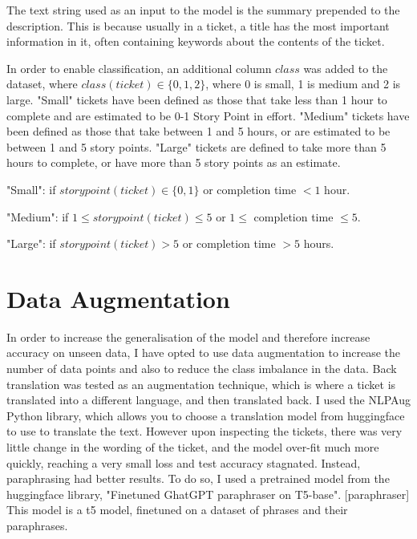 \documentclass{UoYCSproject}
\begin{document}
The text string used as an input to the model is the summary prepended to the description.
This is because usually in a ticket, a title has the most important information in it, often containing keywords about the contents of the ticket. \par

In order to enable classification, an additional column $class$ was added to the dataset, where $class(ticket) \in \{0,1,2\}$, where 0 is small, 1 is medium and 2 is large.
"Small" tickets have been defined as those that take less than 1 hour to complete and are estimated to be 0-1 Story Point in effort.
"Medium" tickets have been defined as those that take between 1 and 5 hours, or are estimated to be between 1 and 5 story points.
"Large" tickets are defined to take more than 5 hours to complete, or have more than 5 story points as an estimate.
    \item "Small": if $storypoint(ticket) \in \{0,1\}$ or completion time $< 1$ hour.
  \item "Medium": if $1 \leq storypoint(ticket) \leq 5$ or $1 \leq$ completion time $\leq 5$.
  \item "Large": if $storypoint(ticket) > 5$ or completion time $> 5$ hours.

%

\section{Data Augmentation}\label{sec:data-augmentation}
In order to increase the generalisation of the model and therefore increase accuracy on unseen data, I have opted to use data augmentation to increase the number of data points and also to reduce the class imbalance in the data.
Back translation was tested as an augmentation technique, which is where a ticket is translated into a different language, and then translated back. I used the NLPAug Python library, which allows you to choose a translation model from huggingface to use to translate the text.
However upon inspecting the tickets, there was very little change in the wording of the ticket, and the model over-fit much more quickly, reaching a very small loss and test accuracy stagnated.
Instead, paraphrasing had better results.
To do so, I used a pretrained model from the huggingface library, "Finetuned GhatGPT paraphraser on T5-base". [paraphraser]
This model is a t5 model, finetuned on a dataset of phrases and their paraphrases.
\end{document}
